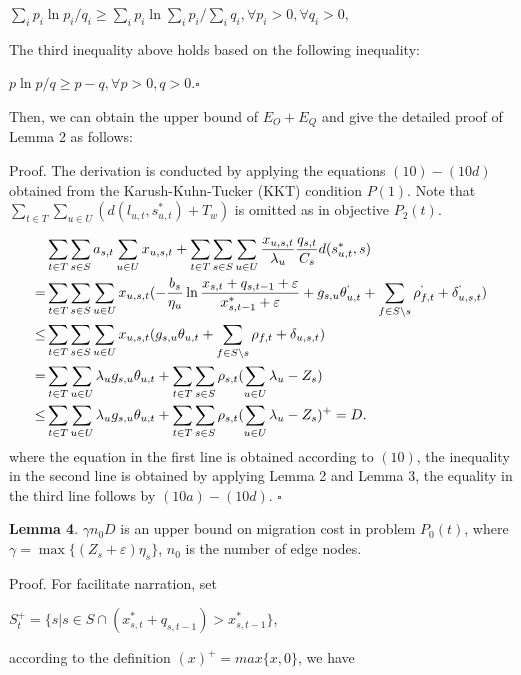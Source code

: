\documentclass[journal,article,submit,pdftex,moreauthors]{Definitions/mdpi}
\begin{document}
$\sum_i p_i \ln p_i /q_i \ge \sum_i p_i \ln \sum_i p_i/ \sum_i q_i, \forall p_i >0,\forall q_i>0,$


The third inequality above holds based on the following inequality:


$p \ln p /q \ge p-q, \forall p >0,q>0$.$\square$


Then, we can obtain the upper bound of $E_O+E_Q$ and give the detailed proof of Lemma 2 as follows:

Proof.  The derivation is conducted by applying the equations $(10)-(10d)$ obtained from the Karush-Kuhn-Tucker (KKT) condition $P(1)$.  Note that $\sum_{t \in T}\sum_{u\in U}(d(l_{u,t},s_{u,t}^*)+T_w)$ is omitted as in objective $P_2(t)$. 

\begin{align*}
&\sum_{t\in T}\sum_{s\in S}a_{s,t}\sum_{u\in U}x_{u,s,t}+\sum_{t\in T}\sum_{s\in S} \sum_{u\in U}\frac{x_{u,s,t}}{\lambda_u}\frac{q_{s,t}}{C_s}d(s_{u,t}^{*},s)\\
=&\sum_{t\in T}\sum_{s\in S} \sum_{u\in U} x_{u,s,t}(-\frac{b_s}{\eta_u}\ln \frac{x_{s,t}+q_{s,t-1}+\varepsilon}{x_{s,t-1}^{*}+\varepsilon}+g_{s,u}\theta_{u,t}^{`}+\sum_{f\in S \backslash s}\rho_{f,t}^{`}+\delta_{u,s,t}^{`})\\
\le & \sum_{t\in T}\sum_{s\in S} \sum_{u\in U} x_{u,s,t}( g_{s,u}\theta_{u,t}+\sum_{f\in S\backslash s}\rho_{f,t}+\delta_{u,s,t})\\
= & \sum_{t\in T}\sum_{u\in U}\lambda_u g_{s,u}\theta_{u,t}+\sum_{t\in T}\sum_{s\in S}\rho_{s,t}(\sum_{u\in U}\lambda_u-Z_s) \\
\le & \sum_{t\in T}\sum_{u\in U}\lambda_u g_{s,u}\theta_{u,t}+\sum_{t\in T}\sum_{s\in S}\rho_{s,t}(\sum_{u\in U}\lambda_u-Z_s)^{+}=D.
\end{align*}
where the equation in the first line is obtained according to $(10)$,   the inequality in the second line is obtained by applying Lemma 2 and Lemma 3,  the equality in the third line follows by $(10a)-(10d)$. $\square$

\textbf{Lemma 4}. $\gamma n_0 D$ is an upper bound on migration cost in problem $P_0(t)$, where $\gamma=\max\{(Z_s+\varepsilon)\eta_s\}$, $n_0$ is the number of edge nodes.  


Proof.  For facilitate narration, set

 \quad $S_t^{+}= \{s|s\in S \cap (x_{s,t}^{*}+q_{s,t-1})>x_{s,t-1}^{*}\}$,

according to the definition $(x)^+=max\{x,0\}$, we have  
\end{document}
